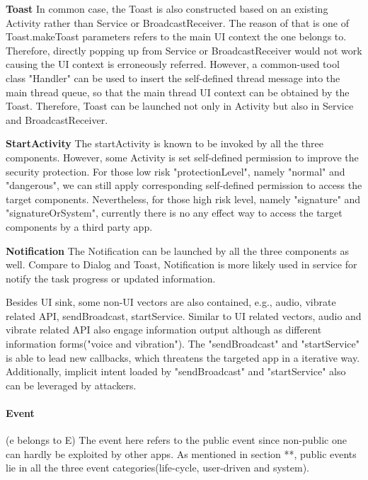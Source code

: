 \documentclass{sig-alternate-05-2015}
\begin{document}
\textbf{Toast}
In common case, the Toast is also constructed based on an existing Activity rather than Service or BroadcastReceiver. The reason of that is one of Toast.makeToast parameters refers to the main UI context the one belongs to. Therefore, directly popping up from Service or BroadcastReceiver would not work causing the UI context is erroneously referred. However, a common-used tool class "Handler" can be used to insert the self-defined thread message into the main thread queue, so that the main thread UI context can be obtained by the Toast. Therefore, Toast can be launched not only in Activity but also in Service and BroadcastReceiver.

\textbf{StartActivity}
The startActivity is known to be invoked by all the three components. However, some Activity is set self-defined permission to improve the security protection. For those low risk "protectionLevel", namely "normal" and "dangerous", we can still apply corresponding self-defined permission to access the target components. Nevertheless, for those high risk level, namely "signature" and "signatureOrSystem", currently there is no any effect way to access the target components by a third party app.

\textbf{Notification}
The Notification can be launched by all the three components as well. Compare to Dialog and Toast, Notification is more likely used in service for notify the task progress or updated information. 



Besides UI sink, some non-UI vectors are also contained, e.g., audio, vibrate related API, sendBroadcast, startService. Similar to UI related vectors, audio and vibrate related API also engage information output although as different information forms("voice and vibration"). The "sendBroadcast" and "startService" is able to lead new callbacks, which threatens the targeted app in a iterative way. Additionally, implicit intent loaded by "sendBroadcast" and "startService" also can be leveraged by attackers.

\paragraph{Event}

(e belongs to E) The event here refers to the public event since non-public one can hardly be exploited by other apps. As mentioned in section **, public events lie in all the three event categories(life-cycle, user-driven and system).
\end{document}

